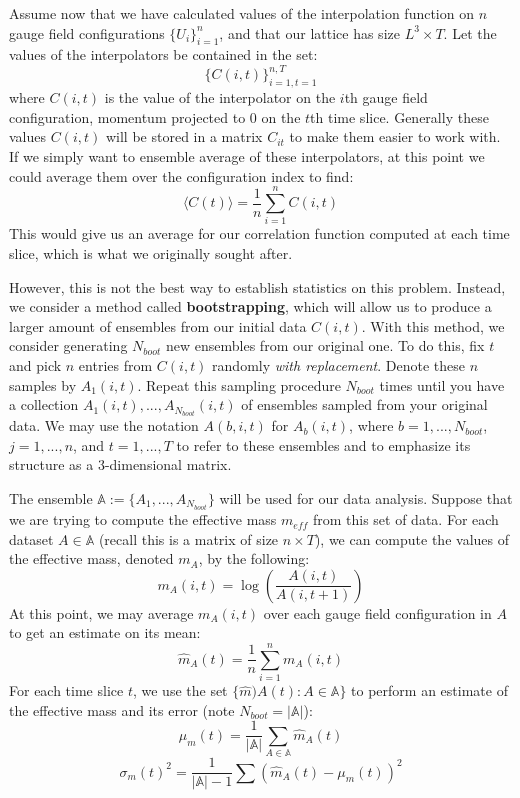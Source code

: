 \documentclass[11pt, oneside]{article}   	%
\theoremstyle{definition}
\begin{document}
Assume now that we have calculated values of the interpolation function on $n$ gauge field configurations 
$\{U_i\}_{i = 1}^n$, and that our lattice has size $L^3\times T$. Let the values of the interpolators be 
contained in the set:
\begin{equation}
	\{C(i, t)\}_{i = 1, t = 1}^{n, T}
\end{equation}
where $C(i, t)$ is the value of the interpolator on the $i$th gauge field configuration, momentum projected 
to 0 on the $t$th time slice. Generally these values $C(i, t)$ will be stored in a matrix $C_{it}$ to make them 
easier to work with. If we simply want to ensemble average of these interpolators, at this point we could 
average them over the configuration index to find:
\begin{equation}
	\langle C(t)\rangle = \frac{1}{n}\sum_{i = 1}^n C(i, t)
\end{equation}
This would give us an average for our correlation function computed at each time slice, which is what we 
originally sought after.

However, this is not the best way to establish statistics on this problem. Instead, we consider a method 
called \textbf{bootstrapping}, which will allow us to produce a larger amount of ensembles from our 
initial data $C(i, t)$. With this method, we consider generating $N_{boot}$ new ensembles from our 
original one. To do this, fix $t$ and pick $n$ entries from $C(i, t)$ randomly \textit{with replacement}. 
Denote these $n$ samples by $A_1(i, t)$. Repeat this sampling procedure $N_{boot}$ times until 
you have a collection $A_1(i, t), ..., A_{N_{boot}}(i, t)$ of ensembles sampled from your original data. 
We may use the notation $A(b, i, t)$ for $A_b(i, t)$, where $b = 1, ..., N_{boot}$, $j = 1, ..., n$, and $t = 
1, ..., T$ to refer to these ensembles and to emphasize its structure as a 3-dimensional matrix. 

The ensemble $\mathbb A := \{A_1, ..., A_{N_{boot}}\}$ will be used for our data analysis. Suppose that we are trying 
to compute the effective mass $m_{eff}$ from this set of data. For each dataset $A\in\mathbb A$ (recall this is a 
matrix of size $n\times T$), we can compute the values of the effective mass, denoted $m_A$, by the following:
\begin{equation}
	m_{A}(i, t) = \log\left(\frac{A(i, t)}{A(i, t + 1)}\right)
\end{equation}
At this point, we may average $m_{A}(i, t)$ over each gauge field configuration in $A$ to get an estimate on its mean:
\begin{equation}
	\hat{m}_A(t) = \frac{1}{n}\sum_{i = 1}^n m_A(i, t)
\end{equation}
For each time slice $t$, we use the set $\{\hat{m})A(t) : A\in\mathbb A\}$ to perform an estimate of the effective mass 
and its error (note $N_{boot} = |\mathbb A|$):
\begin{equation}
	\mu_{m}(t) = \frac{1}{|\mathbb A|}\sum_{A\in\mathbb A}\hat{m}_A(t)
\end{equation}
\begin{equation}
	\sigma_m(t)^2 = \frac{1}{|\mathbb A| - 1}\sum(\hat m_A(t) - \mu_m(t))^2
\end{equation}
\end{document}
